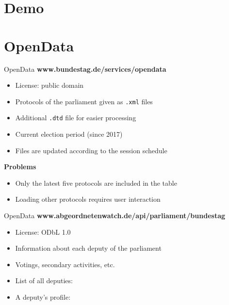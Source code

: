 \documentclass{beamer}
\begin{document}
  \section{Demo}

  \section{OpenData}
  \begin{frame}[plain]{OpenData}
    \textbf{\faAt}\quad\textbf{www.bundestag.de/services/opendata}
    \begin{itemize}
      \item License: public domain
      \item Protocols of the parliament given as \texttt{.xml} files
      \item Additional \texttt{.dtd} file for easier processing
      \item Current election period (since 2017)
      \item Files are updated according to the session schedule
    \end{itemize}
    \textbf{\faExclamationTriangle}\quad\textbf{Problems}
    \begin{itemize}
      \item Only the latest five protocols are included in the table
      \item Loading other protocols requires user interaction
    \end{itemize}  
  \end{frame}

  \begin{frame}[plain]{OpenData}
    \textbf{\faAt}\quad\textbf{www.abgeordnetenwatch.de/api/parliament/bundestag}
    \begin{itemize}
      \item License: ODbL 1.0
      \item Information about each deputy of the parliament
      \item Votings, secondary activities, etc.
      \item List of all deputies:  
      \item A deputy's profile: 
    \end{itemize}
  \end{frame}
\end{document}
